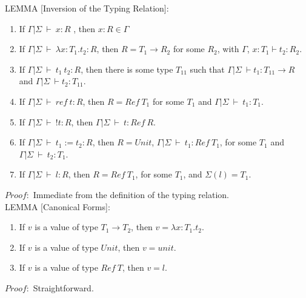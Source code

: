 \documentclass{article}
\newcommand{\env}{{\Gamma | \Sigma \ \vdash}}
\begin{document}
LEMMA [Inversion of the Typing Relation]:
\begin{enumerate}
\item If $\env \ x : R$ , then $x : R \in \Gamma$
\item If $\env \ \lambda x: T_1. t_2 : R$, then $R = T_1 \to R_2$ for some $R_2$, with $\Gamma$, $x : T_1\vdash t_2 : R_2$.
\item If $\env \  t_1 \ t_2 : R$, then there is some type $T_{11}$ such that $\env t_1 : T_{11} \to R$ and $\env t_2 : T_{11}$.
\item If $\env \ ref \ t : R$, then $R = Ref \ T_1$ for some $T_1$ and $\env \ t_1 : T_1.$
\item If $\env \ !t : R$, then $\env \ t : Ref \ R$. 
\item If $\env \ t_1:= t_2 : R$, then $R = Unit$, $\env \ t_1 : Ref \ T_1$, for some $T_1$ and $\env \ t_2 : T_1$.
\item If $\env \ l : R$, then $R = Ref \ T_1$, for some $T_1$, and $\Sigma (l) = T_1$.
\end{enumerate}
$Proof:$ Immediate from the definition of the typing relation.\ \\

LEMMA [Canonical Forms]:
\begin{enumerate}
\item If $v$ is a value of type $T_1 \to T_2$, then $v = \lambda x : T_1. t_2$.
\item If $v$ is a value of type $Unit$, then $v = unit$.
\item If $v$ is a value of type $Ref \ T$, then $v = l$.
\end{enumerate}
$Proof:$ Straightforward.\ \\
\end{document}
